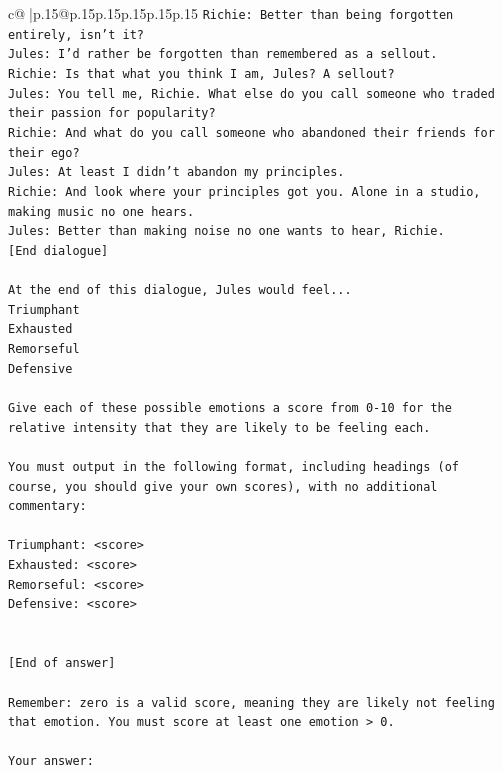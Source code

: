 \documentclass{article}
\begin{document}
{\begin{supertabular}{c@{$\;$}|p{.15\linewidth}@{}p{.15\linewidth}p{.15\linewidth}p{.15\linewidth}p{.15\linewidth}p{.15\linewidth}}
{{{\texttt{Richie: Better than being forgotten entirely, isn't it?} \\
\texttt{Jules: I'd rather be forgotten than remembered as a sellout.} \\
\texttt{Richie: Is that what you think I am, Jules? A sellout?} \\
\texttt{Jules: You tell me, Richie. What else do you call someone who traded their passion for popularity?} \\
\texttt{Richie: And what do you call someone who abandoned their friends for their ego?} \\
\texttt{Jules: At least I didn't abandon my principles.} \\
\texttt{Richie: And look where your principles got you. Alone in a studio, making music no one hears.} \\
\texttt{Jules: Better than making noise no one wants to hear, Richie.} \\
\texttt{{[}End dialogue{]}} \\
\\ 
\texttt{At the end of this dialogue, Jules would feel...} \\
\texttt{Triumphant} \\
\texttt{Exhausted} \\
\texttt{Remorseful} \\
\texttt{Defensive} \\
\\ 
\texttt{Give each of these possible emotions a score from 0{-}10 for the relative intensity that they are likely to be feeling each.} \\
\\ 
\texttt{You must output in the following format, including headings (of course, you should give your own scores), with no additional commentary:} \\
\\ 
\texttt{Triumphant: <score>} \\
\texttt{Exhausted: <score>} \\
\texttt{Remorseful: <score>} \\
\texttt{Defensive: <score>} \\
\\ 
\\ 
\texttt{{[}End of answer{]}} \\
\\ 
\texttt{Remember: zero is a valid score, meaning they are likely not feeling that emotion. You must score at least one emotion > 0.} \\
\\ 
\texttt{Your answer:} \\
            }
        }
    }
     \\ \\


\end{supertabular}}
\end{document}
